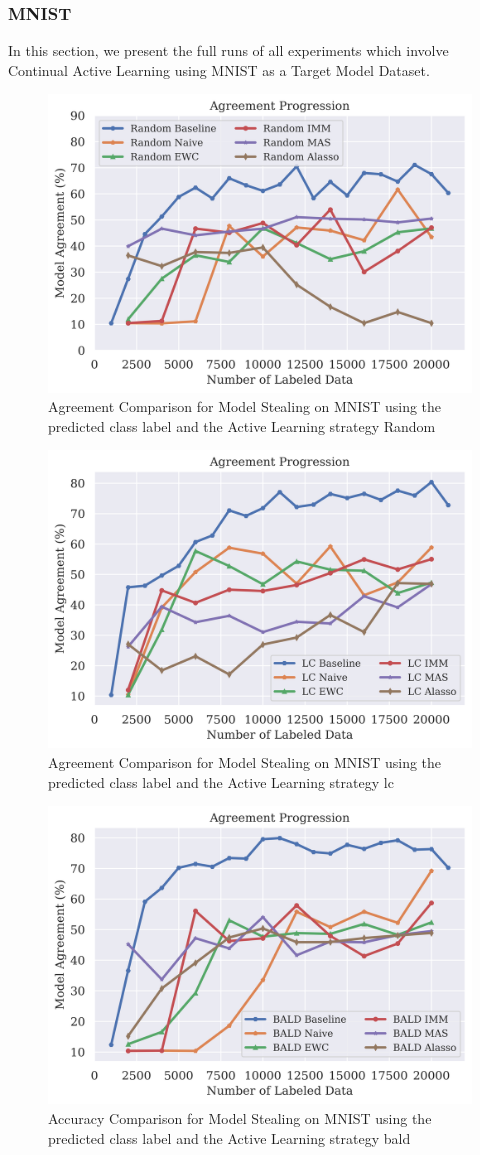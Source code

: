 \subsubsection{MNIST}
\label{sec:Appendix:CALMS:MNIST}
In this section, we present the full runs of all experiments which involve Continual Active Learning using MNIST as a Target Model Dataset.


\begin{figure}[!htb]
    \centering
    \includegraphics[width=0.5\linewidth]{images/results_CALMS/mnist_label_random.png}
    \caption{Agreement Comparison for Model Stealing on MNIST using the predicted class label and the Active Learning strategy Random}
    \label{fig:CALMSMNISTLabelRandom}
\end{figure}

\begin{figure}[!htb]
    \centering
    \includegraphics[width=0.5\linewidth]{images/results_CALMS/mnist_label_lc.png}
    \caption{Agreement Comparison for Model Stealing on MNIST using the predicted class label and the Active Learning strategy \gls{lc}}
    \label{fig:CALMSMNISTLabelLC}
\end{figure}

\begin{figure}[!htb]
    \centering
    \includegraphics[width=0.5\linewidth]{images/results_CALMS/mnist_label_bald.png}
    \caption{Accuracy Comparison for Model Stealing on MNIST using the predicted class label and the Active Learning strategy \gls{bald}}
    \label{fig:CALMSMNISTLabelBALD}
\end{figure}

